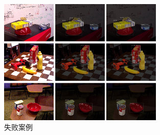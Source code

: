 \begin{figure}[htbp]
\centerline{\includegraphics[width=0.70\textwidth]{figure/ca/failure_case.jpg}}
    \caption{失败案例 }
    \label{fig: failure_case}
\end{figure}
